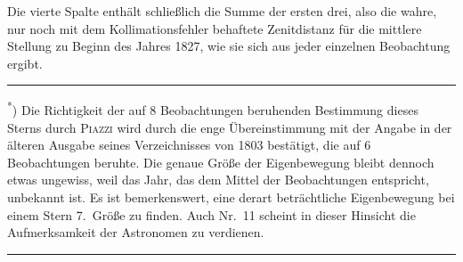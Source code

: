 Die vierte Spalte enthält schließlich die Summe der ersten drei, also die wahre,
nur noch mit dem Kollimationsfehler behaftete Zenitdistanz für die mittlere Stellung
zu Beginn des Jahres 1827, wie sie sich aus jeder einzelnen Beobachtung ergibt.

\medskip\noindent\rule{.24\textwidth}{.4pt}\par
{\footnotesize
\noindent\textsuperscript{*}) Die Richtigkeit der auf 8 Beobachtungen beruhenden Bestimmung
dieses Sterns durch \textsc{Piazzi} wird durch die enge Übereinstimmung mit der Angabe in der
älteren Ausgabe seines Verzeichnisses von 1803 bestätigt, die auf 6 Beobachtungen beruhte.
Die genaue Größe der Eigenbewegung bleibt dennoch etwas ungewiss, weil das Jahr, das dem
Mittel der Beobachtungen entspricht, unbekannt ist. Es ist bemerkenswert, eine derart
beträchtliche Eigenbewegung bei einem Stern 7.\ Größe zu finden. Auch Nr.\ 11 scheint in
dieser Hinsicht die Aufmerksamkeit der Astronomen zu verdienen.\par}
\begin{center}\rule{.24\textwidth}{.4pt}\end{center}
